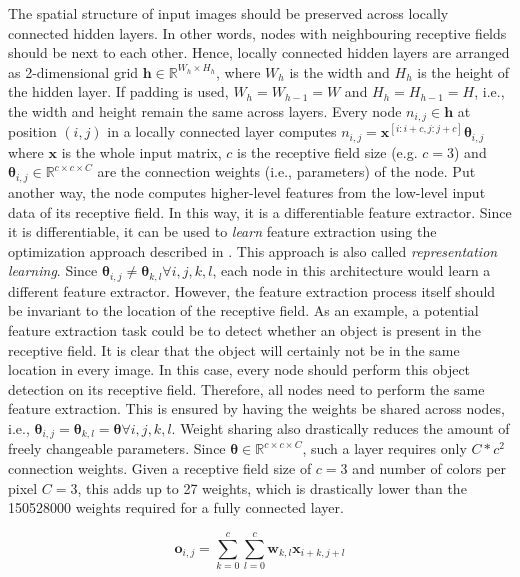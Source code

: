 The spatial structure of input images should be preserved across locally connected hidden layers. In other words, nodes with neighbouring receptive fields should be next to each other. Hence, locally connected hidden layers are arranged as 2-dimensional grid $\textbf{h}\in\mathbb{R}^{W_h\times H_h}$, where $W_h$ is the width and $H_h$ is the height of the hidden layer. If padding is used, $W_h=W_{h-1}=W$ and $H_h=H_{h-1}=H$, i.e., the width and height remain the same across layers. Every node $n_{i,j}\in\mathbf{h}$ at position $(i,j)$ in a locally connected layer computes $n_{i,j}=\mathbf{x}^{[i:i+c,j:j+c]}\boldsymbol{\theta}_{i,j}$ where $\mathbf{x}$ is the whole input matrix, $c$ is the receptive field size (e.g. $c=3$) and $\boldsymbol{\theta}_{i,j} \in \mathbb{R}^{c\times c\times C}$ are the connection weights (i.e., parameters) of the node. Put another way, the node  computes higher-level features from the low-level input data of its receptive field. In this way, it is a differentiable feature extractor. Since it is differentiable, it can be used to \emph{learn} feature extraction using the optimization approach described in . This approach is also called \emph{representation learning}. Since $\boldsymbol{\theta}_{i,j}\neq\boldsymbol{\theta}_{k,l} \forall i,j,k,l$, each node in this architecture would learn a different feature extractor. However, the feature extraction process itself should be invariant to the location of the receptive field. As an example, a potential feature extraction task could be to detect whether an object is present in the receptive field. It is clear that the object will certainly not be in the same location in every image. In this case, every node should perform this object detection on its receptive field. Therefore, all nodes need to perform the same feature extraction. This is ensured by having the weights be shared across nodes, i.e., $\boldsymbol{\theta}_{i,j}=\boldsymbol{\theta}_{k,l}=\boldsymbol{\theta} \forall i,j,k,l$. Weight sharing also drastically reduces the amount of freely changeable parameters. Since $\boldsymbol{\theta} \in \mathbb{R}^{c\times c\times C}$, such a layer requires only $C*c^2$ connection weights. Given a receptive field size of $c=3$ and number of colors per pixel $C=3$, this adds up to 27 weights, which is drastically lower than the 150528000 weights required for a fully connected layer.

\begin{equation}
\label{eq:conv}
    \textbf{o}_{i,j}=\sum_{k=0}^c\sum_{l=0}^c \textbf{w}_{k,l} \textbf{x}_{i+k,j+l}
\end{equation}

